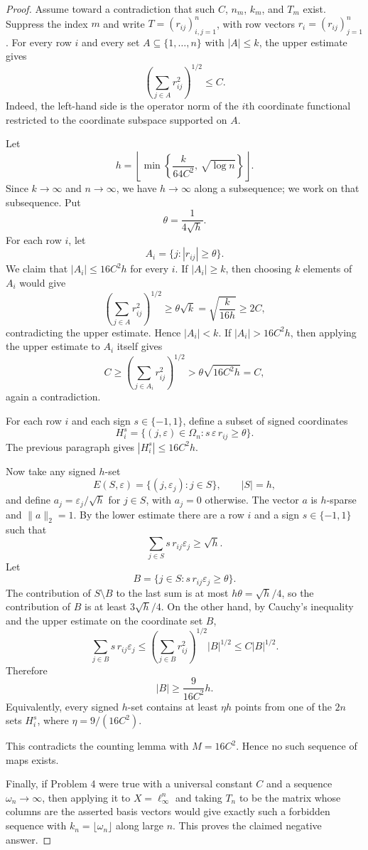 \documentclass[11pt]{article}
\begin{document}
\begin{proof}
Assume toward a contradiction that such $C$, $n_m$, $k_m$, and $T_m$ exist.
Suppress the index $m$ and write $T=(r_{ij})_{i,j=1}^n$, with row vectors
$r_i=(r_{ij})_{j=1}^n$.  For every row $i$ and every set
$A\subseteq\{1,\ldots,n\}$ with $|A|\leq k$, the upper estimate gives
\[
  \left(\sum_{j\in A} r_{ij}^2\right)^{1/2}\leq C.
\]
Indeed, the left-hand side is the operator norm of the $i$th coordinate
functional restricted to the coordinate subspace supported on $A$.

Let
\[
  h=\left\lfloor \min\left\{\frac{k}{64C^2},\,\sqrt{\log n}\right\}\right\rfloor.
\]
Since $k\to\infty$ and $n\to\infty$, we have $h\to\infty$ along a subsequence;
we work on that subsequence.  Put
\[
  \theta=\frac{1}{4\sqrt h}.
\]
For each row $i$, let
\[
  A_i=\{j: |r_{ij}|\geq \theta\}.
\]
We claim that $|A_i|\leq 16C^2h$ for every $i$.  If $|A_i|\geq k$, then
choosing $k$ elements of $A_i$ would give
\[
  \left(\sum_{j\in A} r_{ij}^2\right)^{1/2}
  \geq \theta\sqrt{k}
  =
  \sqrt{\frac{k}{16h}}
  \geq 2C,
\]
contradicting the upper estimate.  Hence $|A_i|<k$.  If
$|A_i|>16C^2h$, then applying the upper estimate to $A_i$ itself gives
\[
  C
  \geq
  \left(\sum_{j\in A_i} r_{ij}^2\right)^{1/2}
  >
  \theta\sqrt{16C^2h}
  =
  C,
\]
again a contradiction.

For each row $i$ and each sign $s\in\{-1,1\}$, define a subset of signed
coordinates
\[
  H_i^s=\{(j,\varepsilon)\in\Omega_n: s\,\varepsilon\, r_{ij}\geq \theta\}.
\]
The previous paragraph gives $|H_i^s|\leq 16C^2h$.

Now take any signed $h$-set
\[
  E(S,\varepsilon)=\{(j,\varepsilon_j):j\in S\},
  \qquad |S|=h,
\]
and define $a_j=\varepsilon_j/\sqrt h$ for $j\in S$, with $a_j=0$ otherwise.
The vector $a$ is $h$-sparse and $\|a\|_2=1$.  By the lower estimate there
are a row $i$ and a sign $s\in\{-1,1\}$ such that
\[
  \sum_{j\in S} s\,r_{ij}\varepsilon_j \geq \sqrt h.
\]
Let
\[
  B=\{j\in S: s\,r_{ij}\varepsilon_j\geq \theta\}.
\]
The contribution of $S\setminus B$ to the last sum is at most
$h\theta=\sqrt h/4$, so the contribution of $B$ is at least $3\sqrt h/4$.
On the other hand, by Cauchy's inequality and the upper estimate on the
coordinate set $B$,
\[
  \sum_{j\in B} s\,r_{ij}\varepsilon_j
  \leq
  \left(\sum_{j\in B}r_{ij}^2\right)^{1/2}|B|^{1/2}
  \leq C|B|^{1/2}.
\]
Therefore
\[
  |B|\geq \frac{9}{16C^2}h.
\]
Equivalently, every signed $h$-set contains at least
$\eta h$ points from one of the $2n$ sets $H_i^s$, where
$\eta=9/(16C^2)$.

This contradicts the counting lemma with $M=16C^2$.  Hence no such sequence of
maps exists.

Finally, if Problem 4 were true with a universal constant $C$ and a sequence
$\omega_n\to\infty$, then applying it to $X=\ell_\infty^n$ and taking $T_n$
to be the matrix whose columns are the asserted basis vectors would give
exactly such a forbidden sequence with $k_n=\lfloor \omega_n\rfloor$ along
large $n$.  This proves the claimed negative answer.
\end{proof}
\end{document}
